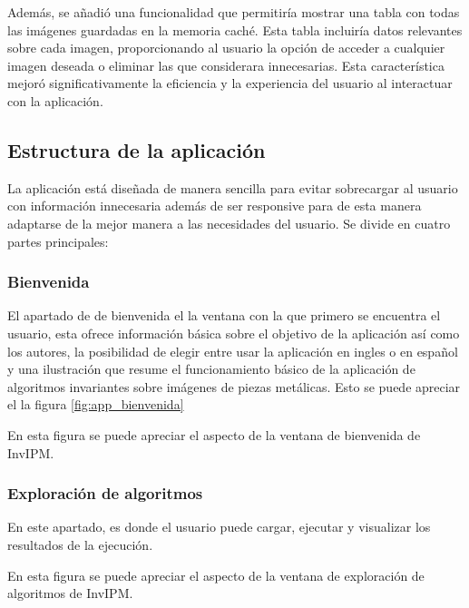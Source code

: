 Además, se añadió una funcionalidad que permitiría mostrar una tabla con todas las imágenes guardadas en la memoria caché. Esta tabla incluiría datos relevantes sobre cada imagen, proporcionando al usuario la opción de acceder a cualquier imagen deseada o eliminar las que considerara innecesarias. Esta característica mejoró significativamente la eficiencia y la experiencia del usuario al interactuar con la aplicación.

\subsection{Estructura de la aplicación}\label{estructura-de-la-aplicación}

La aplicación está diseñada de manera sencilla para evitar sobrecargar al usuario con información innecesaria además de ser responsive para de esta manera adaptarse de la mejor manera a las necesidades del usuario. Se divide en cuatro partes principales:

\subsubsection{Bienvenida}\label{bienvenida}

El apartado de de bienvenida el la ventana con la que primero se encuentra el usuario, esta ofrece información básica sobre el objetivo de la aplicación así como los autores, la posibilidad de elegir entre usar la aplicación en ingles o en español y una ilustración que resume el funcionamiento básico de la aplicación de algoritmos invariantes sobre imágenes de piezas metálicas. Esto se puede apreciar el la figura \ref{fig:app_bienvenida}


En esta figura se puede apreciar el aspecto de la ventana de bienvenida de InvIPM.

\subsubsection{Exploración de algoritmos}\label{exploración-de-algoritmos}

En este apartado, es donde el usuario puede cargar, ejecutar y visualizar los resultados de la ejecución.


En esta figura se puede apreciar el aspecto de la ventana de exploración de algoritmos de InvIPM.

